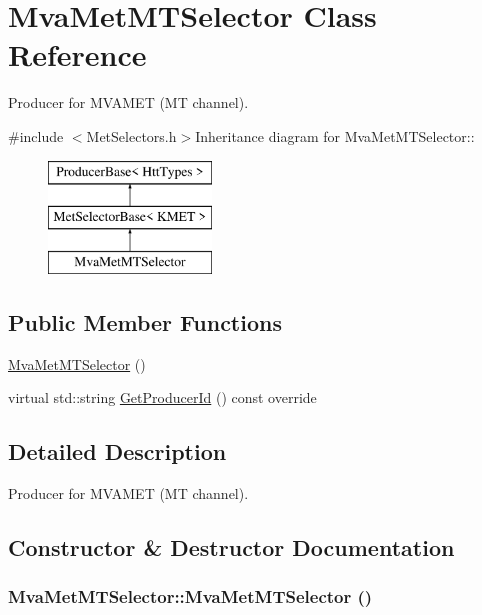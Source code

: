 \hypertarget{classMvaMetMTSelector}{
\section{MvaMetMTSelector Class Reference}
\label{classMvaMetMTSelector}
}


Producer for MVAMET (MT channel).  


{\ttfamily \#include $<$MetSelectors.h$>$}Inheritance diagram for MvaMetMTSelector::\begin{figure}[H]
\begin{center}
\leavevmode
\includegraphics[height=3cm]{classMvaMetMTSelector}
\end{center}
\end{figure}
\subsection*{Public Member Functions}
\begin{DoxyCompactItemize}
\item 
\hyperlink{classMvaMetMTSelector_a367a5ad09f3c187bd0ee79f945c494cf}{MvaMetMTSelector} ()
\item 
virtual std::string \hyperlink{classMvaMetMTSelector_a5fb79d33d8da06cb1b7c3a1ad9837d69}{GetProducerId} () const override
\end{DoxyCompactItemize}


\subsection{Detailed Description}
Producer for MVAMET (MT channel). 

\subsection{Constructor \& Destructor Documentation}
\hypertarget{classMvaMetMTSelector_a367a5ad09f3c187bd0ee79f945c494cf}{
\subsubsection[{MvaMetMTSelector}]{\setlength{\rightskip}{0pt plus 5cm}MvaMetMTSelector::MvaMetMTSelector ()}}
\label{classMvaMetMTSelector_a367a5ad09f3c187bd0ee79f945c494cf}


